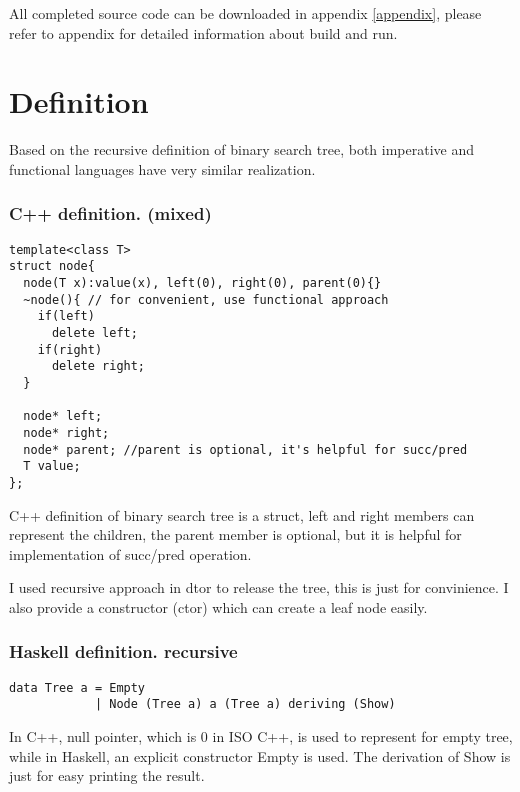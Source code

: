 \documentclass{article}
\begin{document}
All completed source code can be downloaded in appendix \ref{appendix}, please refer to appendix
for detailed information about build and run.

\section{Definition}
\label{definition}

Based on the recursive definition of binary search tree, both imperative and functional 
languages have very similar realization.

\subsubsection*{C++ definition. (mixed)}
\lstset{language=C++}
\begin{lstlisting}
template<class T>
struct node{
  node(T x):value(x), left(0), right(0), parent(0){}
  ~node(){ // for convenient, use functional approach
    if(left)
      delete left;
    if(right)
      delete right;
  }

  node* left; 
  node* right;
  node* parent; //parent is optional, it's helpful for succ/pred
  T value;
};
\end{lstlisting}

C++ definition of binary search tree is a struct, left
and right members can represent the children, the parent member is optional, but
it is helpful for implementation of succ/pred operation.

I used recursive approach in dtor to release the tree, this is just for 
convinience. I also provide a constructor (ctor) which can create a leaf
node easily.

\subsubsection*{Haskell definition. recursive}
\lstset{language=Haskell}
\begin{lstlisting}
data Tree a = Empty 
            | Node (Tree a) a (Tree a) deriving (Show)
\end{lstlisting}

In C++, null pointer, which is 0 in ISO C++, is used to represent for empty
tree, while in Haskell, an explicit constructor Empty is used. The derivation
of Show is just for easy printing the result.
\end{document}
